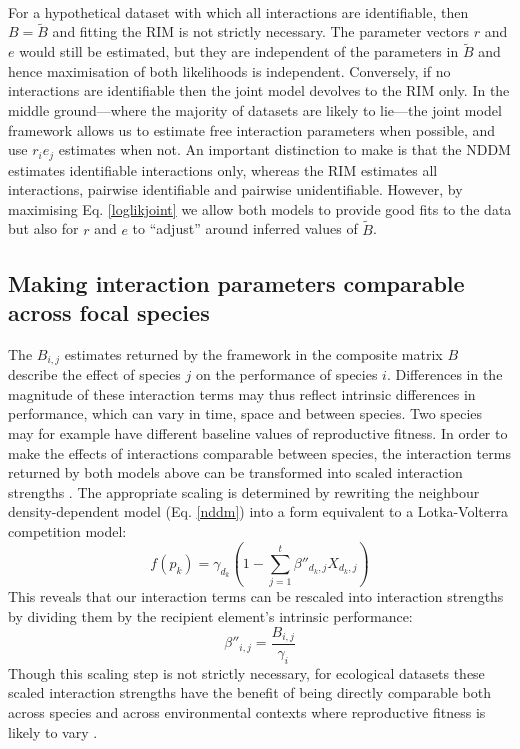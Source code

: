 \documentclass[a4,12pt]{article}
\begin{document}
\begin{refsection}
    \paragraph{}
    For a hypothetical dataset with which all interactions are identifiable, then $B = \tilde B$ and fitting the RIM is not strictly necessary. The parameter vectors $r$ and $e$ would still be estimated, but they are independent of the parameters in $\tilde B$ and hence maximisation of both likelihoods is independent. Conversely, if no interactions are identifiable then the joint model devolves to the RIM only. In the middle ground---where the majority of datasets are likely to lie---the joint model framework allows us to estimate free interaction parameters when possible, and use $r_i e_j$ estimates when not. An important distinction to make is that the NDDM estimates identifiable interactions only, whereas the RIM estimates all interactions, pairwise identifiable and pairwise unidentifiable. However, by maximising Eq. \ref{loglikjoint} we allow both models to provide good fits to the data but also for $r$ and $e$ to ``adjust'' around inferred values of $\tilde B$. 


    \subsection{Making interaction parameters comparable across focal species} 

        The $B_{i, j}$ estimates returned by the framework in the composite matrix $B$ describe the effect of species $j$ on the performance of species $i$. Differences in the magnitude of these interaction terms may thus reflect intrinsic differences in performance, which can vary in time, space and between species. Two species may for example have different baseline values of reproductive fitness. In order to make the effects of interactions comparable between species, the interaction terms returned by both models above can be transformed into scaled interaction strengths \parencite{Laska1998}. The appropriate scaling is determined by rewriting the neighbour density-dependent model (Eq. \ref{nddm}) into a form equivalent to a Lotka-Volterra competition model: 
        \begin{equation}
        f(p_{k}) = \gamma_{d_k} \left ( 1 - \sum_{j=1}^{t} {\beta}''_{d_k, j} X_{d_k, j} \right )
        \label{LVform}
        \end{equation}
        This reveals that our interaction terms can be rescaled into interaction strengths by dividing them by the recipient element's intrinsic performance:  
        \begin{equation}
        {\beta}''_{i, j} = \frac{B_{i, j}}{\gamma_{i}}
        \label{scaling}
        \end{equation}
        Though this scaling step is not strictly necessary, for ecological datasets these scaled interaction strengths have the benefit of being directly comparable both across species and across environmental contexts where reproductive fitness is likely to vary \parencite{Wootton2005}.


\end{refsection}
\end{document}
